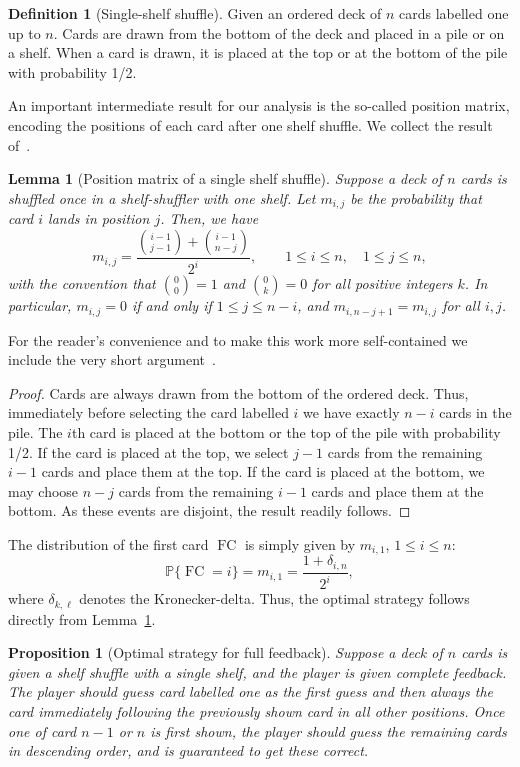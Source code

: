\documentclass[10pt,reqno,a4paper]{amsart}
\newtheorem{lem}[theorem]{Lemma}
\newtheorem{prop}{Proposition}
\theoremstyle{definition}
\newtheorem{defi}{Definition}
\def\P{{\mathbb {P}}}
\DeclareMathOperator{\fc}{FC}
\begin{document}
\begin{defi}[Single-shelf shuffle]
Given an ordered deck of $n$ cards labelled one up to $n$. Cards are drawn from the bottom of the deck and placed in a pile or on a shelf. 
When a card is drawn, it is placed at the top or at the bottom of the pile with probability 1/2.
\end{defi}

An important intermediate result for our analysis is the so-called position matrix, encoding the positions of each card after one shelf shuffle.
We collect the result of~\cite{Clay2025a}. 
\begin{lem}[Position matrix of a single shelf shuffle]
\label{lem:posi}
Suppose a deck of $n$ cards is shuffled once in a shelf-shuffler with one shelf.
Let $m_{i,j}$ be the probability that card $i$ lands in position $j$.
Then, we have
\[
m_{i,j}
=
\frac{\binom{i-1}{j-1} + \binom{i-1}{n-j}}{2^i},
\qquad
1 \le i \le n,
\quad
1 \le j \le n,
\]
with the convention that $\binom{0}{0} = 1$ and $\binom{0}{k} = 0$
for all positive integers $k$.
In particular,
$m_{i,j} = 0$ if and only if $1 \le j \le n-i$,
and $m_{i,n-j+1} = m_{i,j}$ for all $i,j$.
\end{lem}

For the reader's convenience and to make this work more self-contained we include the very short argument~\cite{Clay2025a}. 
\begin{proof}
Cards are always drawn from the bottom of the ordered deck. Thus, immediately before selecting the card labelled $i$ we have exactly $n-i$ cards in the pile. The $i$th card is placed at the bottom 
or the top of the pile with probability 1/2. If the card is placed at the top, we select $j-1$ cards from the remaining $i-1$ cards
and place them at the top. If the card is placed at the bottom, we may choose $n-j$ cards from the remaining $i - 1$ cards and place them at the bottom. 
As these events are disjoint, the result readily follows.
\end{proof}
The distribution of the first card $\fc$ is simply given by $m_{i,1}$, $1\le i\le n$:
\begin{equation}
\label{eq:fc}
\P\{\fc=i\}=m_{i,1}=\frac{1+\delta_{i,n}}{2^i},
\end{equation}
where $\delta_{k,\ell}$ denotes the Kronecker-delta. Thus, the optimal strategy follows directly from Lemma~\ref{lem:posi}.


\begin{prop}[Optimal strategy for full feedback]
\label{prop:opti}
Suppose a deck of $n$ cards is given a shelf shuffle with a single shelf,
and the player is given complete feedback. The player should guess card labelled one as the first guess and then always the card immediately following the previously shown card in all other positions.
Once one of card $n-1$ or $n$ is first shown, the player should guess the remaining cards in descending order, and is guaranteed to get these correct.
\end{prop}
\end{document}

